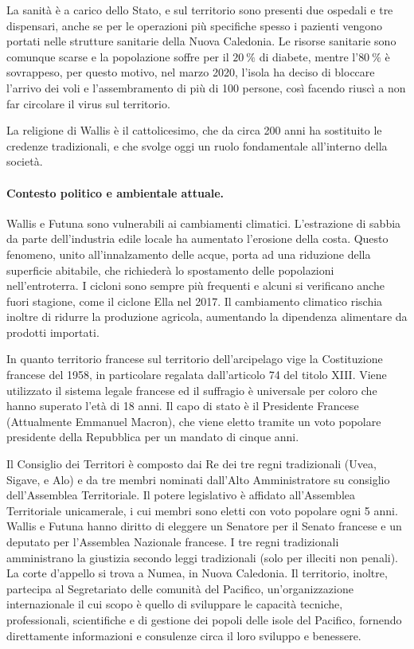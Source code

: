 \documentclass[fleqn,11pt]{SelfArx} %
\begin{document}
La sanità è a carico dello Stato, e sul territorio sono presenti due ospedali e tre dispensari, anche se per le operazioni più specifiche spesso i pazienti vengono portati nelle strutture sanitarie della Nuova Caledonia.
Le risorse sanitarie sono comunque scarse e la popolazione soffre per il \(\SI{20}{\percent}\) di diabete, mentre l'\(\SI{80}{\percent}\) è sovrappeso, per questo motivo, nel marzo 2020, l'isola ha deciso di bloccare l'arrivo dei voli e l'assembramento di più di 100 persone, così facendo riuscì a non far circolare il virus sul territorio.

La religione di Wallis è il cattolicesimo, che da circa 200 anni ha sostituito le credenze tradizionali, e che svolge oggi un ruolo fondamentale all'interno della società.

\paragraph*{Contesto politico e ambientale attuale.}
Wallis e Futuna sono vulnerabili ai cambiamenti climatici.
L'estrazione di sabbia da parte dell'industria edile locale ha aumentato l'erosione della costa. 
Questo fenomeno, unito all'innalzamento delle acque, porta ad una riduzione della superficie abitabile, che richiederà lo spostamento delle popolazioni nell'entroterra.
I cicloni sono sempre più frequenti e alcuni si verificano anche fuori stagione, come il ciclone Ella nel 2017.
Il cambiamento climatico rischia inoltre di ridurre la produzione agricola, aumentando la dipendenza alimentare da prodotti importati.

In quanto territorio francese sul territorio dell'arcipelago vige la Costituzione francese del 1958, in particolare regalata dall'articolo 74 del titolo XIII.
Viene utilizzato il sistema legale francese ed il suffragio è universale per coloro che hanno superato l'età di 18 anni.
Il capo di stato è il Presidente Francese (Attualmente Emmanuel Macron), che viene eletto tramite un voto popolare presidente della Repubblica per un mandato di cinque anni.

Il Consiglio dei Territori è composto dai Re dei tre regni tradizionali (Uvea, Sigave, e Alo) e da tre membri nominati dall'Alto Amministratore su consiglio dell'Assemblea Territoriale.
Il potere legislativo è affidato all'Assemblea Territoriale unicamerale, i cui membri sono eletti con voto popolare ogni 5 anni.
Wallis e Futuna hanno diritto di eleggere un Senatore per il Senato francese e un deputato per l'Assemblea Nazionale francese.
I tre regni tradizionali amministrano la giustizia secondo leggi tradizionali (solo per illeciti non penali).
La corte d'appello si trova a Numea, in Nuova Caledonia. 
Il territorio, inoltre, partecipa al Segretariato delle comunità del Pacifico, un'organizzazione internazionale il cui scopo è quello di sviluppare le capacità tecniche, professionali, scientifiche e di gestione dei popoli delle isole del Pacifico, fornendo direttamente informazioni e consulenze circa il loro sviluppo e benessere.
\end{document}
